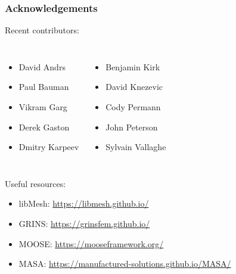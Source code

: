\documentclass[mathserif]{beamer}
\begin{document}
\begin{frame}
\frametitle{Acknowledgements}

Recent contributors:
\begin{columns}


\begin{itemize}
\item David Andrs
\item Paul Bauman
\item Vikram Garg
\item Derek Gaston
\item Dmitry Karpeev 
\end{itemize}

\begin{itemize}
\item Benjamin Kirk
\item David Knezevic
\item Cody Permann
\item John Peterson 
\item Sylvain Vallaghe
\end{itemize}

\end{columns}

\vspace{5mm}

Useful resources:
\begin{itemize}
\item libMesh: \url{https://libmesh.github.io/}
\item GRINS: \url{https://grinsfem.github.io/}
\item MOOSE: \url{https://mooseframework.org/}
\item MASA: \url{https://manufactured-solutions.github.io/MASA/}
\end{itemize}

\begin{columns}[c] 
\begin{column}{.5\textwidth} 
\begin{block}{}
\end{block}
\end{column}
\end{columns}


\end{frame}

 
\end{document}
